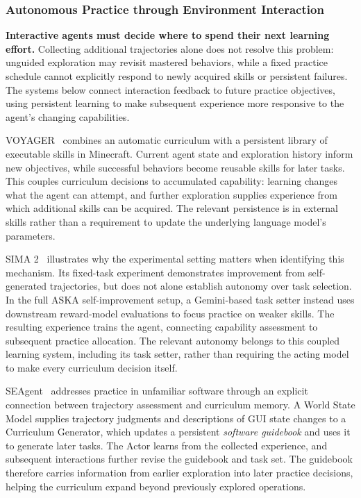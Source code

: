 \subsubsection{Autonomous Practice through Environment Interaction}

\noindent\textbf{Interactive agents must decide where to spend their next
learning effort.}
Collecting additional trajectories alone does not resolve this problem:
unguided exploration may revisit mastered behaviors, while a fixed practice
schedule cannot explicitly respond to newly acquired skills or persistent
failures.
The systems below connect interaction feedback to future practice objectives,
using persistent learning to make subsequent experience more responsive to
the agent's changing capabilities.

VOYAGER~\cite{wang2023voyager} combines an automatic curriculum with a
persistent library of executable skills in Minecraft.
Current agent state and exploration history inform new objectives, while
successful behaviors become reusable skills for later tasks.
This couples curriculum decisions to accumulated capability: learning
changes what the agent can attempt, and further exploration supplies
experience from which additional skills can be acquired.
The relevant persistence is in external skills rather than a requirement
to update the underlying language model's parameters.

SIMA 2~\cite{deepmind2025sima2} illustrates why the experimental setting
matters when identifying this mechanism.
Its fixed-task experiment demonstrates improvement from self-generated
trajectories, but does not alone establish autonomy over task selection.
In the full ASKA self-improvement setup, a Gemini-based task setter instead
uses downstream reward-model evaluations to focus practice on weaker skills.
The resulting experience trains the agent, connecting capability assessment
to subsequent practice allocation.
The relevant autonomy belongs to this coupled learning system, including
its task setter, rather than requiring the acting model to make every
curriculum decision itself.

SEAgent~\cite{sun2026seagent} addresses practice in unfamiliar software
through an explicit connection between trajectory assessment and curriculum
memory.
A World State Model supplies trajectory judgments and descriptions of GUI
state changes to a Curriculum Generator, which updates a persistent
\emph{software guidebook} and uses it to generate later tasks.
The Actor learns from the collected experience, and subsequent interactions
further revise the guidebook and task set.
The guidebook therefore carries information from earlier exploration into
later practice decisions, helping the curriculum expand beyond previously
explored operations.

